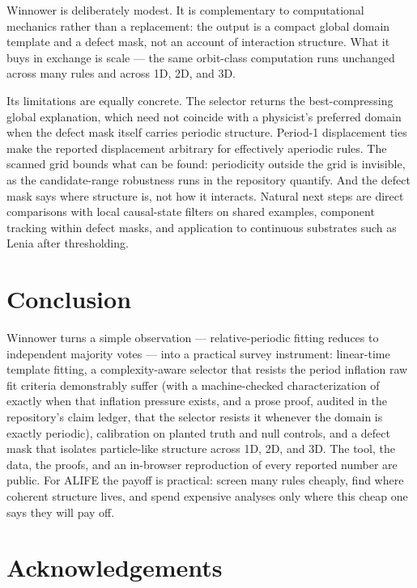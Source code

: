 \documentclass[letterpaper]{article}
\begin{document}
Winnower is deliberately modest. It is complementary to computational
mechanics rather than a replacement: the output is a compact global
domain template and a defect mask, not an account of interaction structure.
What it buys in exchange is scale --- the same orbit-class computation
runs unchanged across many rules and across 1D, 2D, and 3D.

Its limitations are equally concrete. The selector returns the
best-compressing global explanation, which need not coincide with a
physicist's preferred domain when the defect mask itself carries
periodic structure. Period-1 displacement ties make the reported
displacement arbitrary for effectively aperiodic rules. The scanned
grid bounds what can be found: periodicity outside the grid is
invisible, as the candidate-range robustness runs in the repository
quantify. And the defect mask says where structure is, not how it
interacts. Natural next steps are direct comparisons with local
causal-state filters on shared examples, component tracking within
defect masks, and application to continuous substrates such as Lenia
after thresholding.

\section{Conclusion}

Winnower turns a simple observation --- relative-periodic fitting
reduces to independent majority votes --- into a practical survey
instrument: linear-time template fitting, a complexity-aware selector
that resists the period inflation raw fit criteria demonstrably suffer
(with a machine-checked characterization of exactly when that inflation
pressure exists, and a prose proof, audited in the repository's claim
ledger, that the selector resists it whenever the domain is exactly
periodic),
calibration on planted truth and null controls, and a defect mask
that isolates particle-like structure across 1D, 2D, and 3D. The tool, the data, the
proofs, and an in-browser reproduction of every reported number are
public. For ALIFE the payoff is practical: screen many rules cheaply,
find where coherent structure lives, and spend expensive analyses only
where this cheap one says they will pay off.

\section*{Acknowledgements}
\end{document}
